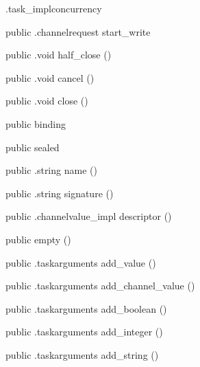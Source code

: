 \begin{CrexxClass}{.task\_impl}{concurrency}
\begin{Members}
    \Method
      {public}
      {.channelrequest}
      {start\_write}
      {}

    \Method
      {public}
      {.void}
      {half\_close}
      {()}

    \Method
      {public}
      {.void}
      {cancel}
      {()}

    \Method
      {public}
      {.void}
      {close}
      {()}

    \Factory
      {public}
      {binding}
      {}

    \Factory
      {public}
      {sealed}
      {}

    \Method
      {public}
      {.string}
      {name}
      {()}

    \Method
      {public}
      {.string}
      {signature}
      {()}

    \Method
      {public}
      {.channelvalue\_impl}
      {descriptor}
      {()}

    \Factory
      {public}
      {empty}
      {()}

    \Method
      {public}
      {.taskarguments}
      {add\_value}
      {()}

    \Method
      {public}
      {.taskarguments}
      {add\_channel\_value}
      {()}

    \Method
      {public}
      {.taskarguments}
      {add\_boolean}
      {()}

    \Method
      {public}
      {.taskarguments}
      {add\_integer}
      {()}

    \Method
      {public}
      {.taskarguments}
      {add\_string}
      {()}


\end{Members}
\end{CrexxClass}
